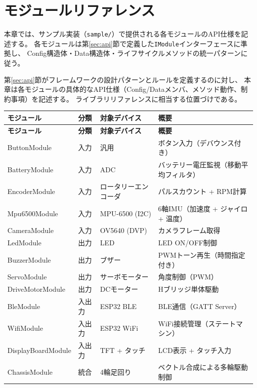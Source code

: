 \section{モジュールリファレンス}\label{sec:module-ref}

本章では、サンプル実装（\texttt{sample/}）で提供される各モジュールのAPI仕様を記述する。
各モジュールは第\ref{sec:api}節で定義した\texttt{IModule}インターフェースに準拠し、
Config構造体・Data構造体・ライフサイクルメソッドの統一パターンに従う。

\begin{notebox}[本章の位置づけ]
第\ref{sec:api}節がフレームワークの設計パターンとルールを定義するのに対し、
本章は各モジュールの具体的なAPI仕様（Config/Dataメンバ、メソッド動作、制約事項）を記述する。
ライブラリリファレンスに相当する位置づけである。
\end{notebox}

\begin{longtable}{l l l p{5.5cm}}
\toprule
\textbf{モジュール} & \textbf{分類} & \textbf{対象デバイス} & \textbf{概要} \\
\midrule
\endfirsthead
\toprule
\textbf{モジュール} & \textbf{分類} & \textbf{対象デバイス} & \textbf{概要} \\
\midrule
\endhead
ButtonModule       & 入力   & 汎用               & ボタン入力（デバウンス付き） \\
BatteryModule      & 入力   & ADC                & バッテリー電圧監視（移動平均フィルタ） \\
EncoderModule      & 入力   & ロータリーエンコーダ & パルスカウント + RPM計算 \\
Mpu6500Module      & 入力   & MPU-6500 (I2C)     & 6軸IMU（加速度 + ジャイロ + 温度） \\
CameraModule       & 入力   & OV5640 (DVP)       & カメラフレーム取得 \\
\midrule
LedModule          & 出力   & LED                & LED ON/OFF制御 \\
BuzzerModule       & 出力   & ブザー              & PWMトーン再生（時間指定付き） \\
ServoModule        & 出力   & サーボモーター       & 角度制御（PWM） \\
DriveMotorModule   & 出力   & DCモーター          & Hブリッジ単体駆動 \\
\midrule
BleModule          & 入出力 & ESP32 BLE          & BLE通信（GATT Server） \\
WifiModule         & 入出力 & ESP32 WiFi         & WiFi接続管理（ステートマシン） \\
DisplayBoardModule & 入出力 & TFT + タッチ        & LCD表示 + タッチ入力 \\
\midrule
ChassisModule      & 統合   & 4輪足回り           & ベクトル合成による多輪駆動制御 \\
\bottomrule
\end{longtable}

